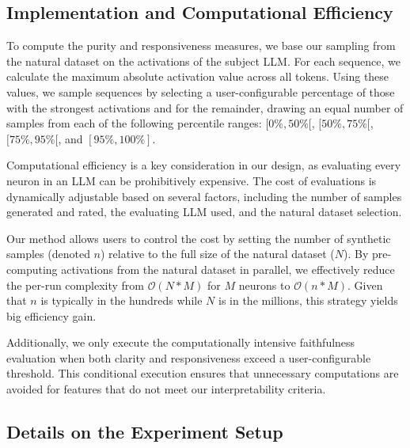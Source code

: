 \subsection{Implementation and Computational Efficiency}\label{appendix-evaluation-implementation}

To compute the purity and responsiveness measures, we base our sampling from the natural dataset on the activations of the subject LLM. For each sequence, we calculate the maximum absolute activation value across all tokens. Using these values, we sample sequences by selecting a user-configurable percentage of those with the strongest activations and for the remainder, drawing an equal number of samples from each of the following percentile ranges: 
\([0\%, 50\%[\), 
\([50\%, 75\%[\), 
\([75\%, 95\%[\), 
and \([95\%, 100\%]\).

Computational efficiency is a key consideration in our design, as evaluating every neuron in an LLM can be prohibitively expensive. The cost of evaluations is dynamically adjustable based on several factors, including the number of samples generated and rated, the evaluating LLM used, and the natural dataset selection. 

Our method allows users to control the cost by setting the number of synthetic samples (denoted $n$) relative to the full size of the natural dataset ($N$). By pre-computing activations from the natural dataset in parallel, we effectively reduce the per-run complexity from $\mathcal{O}(N*M)$ for $M$ neurons to $\mathcal{O}(n*M)$. Given that $n$ is typically in the hundreds while $N$ is in the millions, this strategy yields big efficiency gain.

Additionally, we only execute the computationally intensive faithfulness evaluation when both clarity and responsiveness exceed a user-configurable threshold. This conditional execution ensures that unnecessary computations are avoided for features that do not meet our interpretability criteria.


\subsection{Details on the Experiment Setup}\label{appendix-evaluation-experiment-setup}


